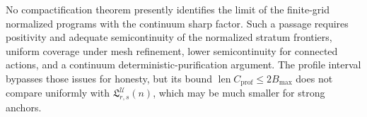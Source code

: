 No compactification theorem presently identifies the limit of the finite-grid normalized programs with the continuum sharp factor.  Such a passage requires positivity and adequate semicontinuity of the normalized stratum frontiers, uniform coverage under mesh refinement, lower semicontinuity for connected actions, and a continuum deterministic-purification argument.  The profile interval bypasses those issues for honesty, but its bound \(\operatorname{len}C_{\mathrm{prof}}\leq2B_{\max}\) does not compare uniformly with \(\mathfrak L_{r,s}^{\mathcal U}(n)\), which may be much smaller for strong anchors.